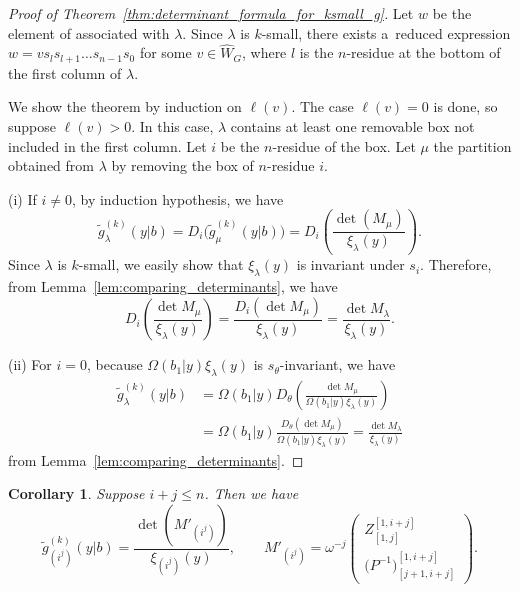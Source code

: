 \documentclass[pdftex]{sigma}
\numberwithin{equation}{section}
\newcommand{\co}{\xi}
\newcommand{\la}{\lambda}
\newtheorem{Corollary}[Theorem]{Corollary}
\theoremstyle{definition}
\begin{document}
\begin{proof}[Proof of Theorem~\ref{thm:determinant_formula_for_ksmall_g}]
Let $w$ be the element of  associated with $\lambda$.
Since $\lambda$ is $k$-small, there exists a~reduced expression $w=vs_ls_{l+1}\dots s_{n-1}s_0$ for some \label{$w'$ is not affine Grassmannian.}
$v\in \hat{W}_{G}$, where $l$ is the $n$-residue at the bottom of the first column of $\lambda$.


We show the theorem by induction on $\ell(v)$.
The case $\ell(v)=0$ is done, so suppose $\ell(v)>0$.
In this case, $\lambda$ contains at least one removable box
not included in the first column.
Let $i$ be the $n$-residue of the box.
Let $\mu$ the partition obtained from $\la$ by removing
the box of $n$-residue $i$.

(i) If $i\neq 0$, by induction hypothesis, we have
\[
\tilde{g}^{(k)}_\lambda(y|b)=
D_i\bigl(
\tilde{g}^{(k)}_{\mu}(y|b)
\bigr)
=
D_i
\left(
\frac{
\det(M_{\mu})
}{\co_\la(y)}
\right).
\]
Since $\lambda$ is $k$-small, we easily show that $\co_\la(y)$ is invariant under $s_i$.
Therefore, from Lemma~\ref{lem:comparing_determinants}, we have
\[
D_{i}\left(
\frac{\det M_{\mu}}{\co_\la(y)}
\right)
=
\frac{
D_{i}(\det M_{\mu})}{\co_\la(y)}
=
\frac{\det M_{\lambda}}{\co_\la(y)}.
\]

(ii) For $i=0$, because $\Omega(b_1|y)\co_\la(y)$ is $s_\theta$-invariant, we have
\[
\begin{aligned}
\tilde{g}^{(k)}_\lambda(y|b)
&
=
\Omega(b_1|y)
D_\theta
\left(
\frac{
\det M_{\mu}
}{\Omega(b_1|y)\co_\la(y)}
\right)\\
&
=
\Omega(b_1|y)
\frac{
D_\theta(\det M_{\mu})}{\Omega(b_1|y)\co_\la(y)}
=
\frac{\det M_{\lambda}}{\co_\la(y)}
\end{aligned}
\]
from Lemma~\ref{lem:comparing_determinants}.
\end{proof}

\begin{Corollary}\label{cor:g_rectangle}
Suppose $i+j\le n$.
Then we have
\[
\tilde{g}^{(k)}_{(i^j)}(y|b)=
\frac{
\det(M'_{(i^j)})
}{\co_{(i^j)}(y)},\qquad
M'_{(i^j)}=\omega^{-j}
\left(
\begin{matrix}
Z_{[1,j]}^{[1,i+j]}\\\hline
{
\bigl(P^{-1}\bigr)}^{[1,i+j]}_{[j+1,i+j]}
\end{matrix}
\right).
\]
\end{Corollary}
\end{document}
